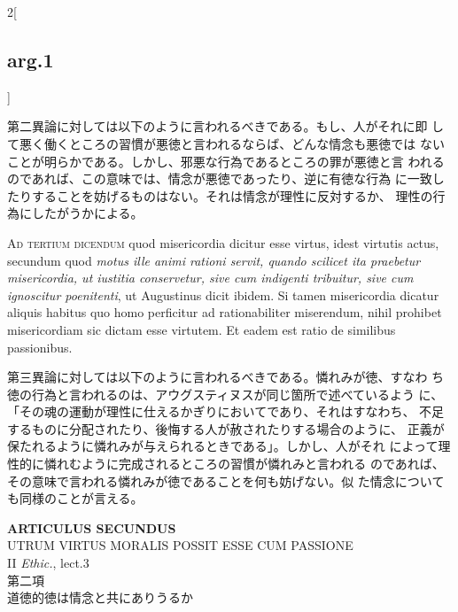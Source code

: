 \documentclass[paper=a4paper,fontsize=10pt,jafontsize=9pt,titlepage]{jlreq}
\begin{document}
\begin{paracol}{2}[\subsection{arg.1}]
\switchcolumn

第二異論に対しては以下のように言われるべきである。もし、人がそれに即
 して悪く働くところの習慣が悪徳と言われるならば、どんな情念も悪徳では
 ないことが明らかである。しかし、邪悪な行為であるところの罪が悪徳と言
 われるのであれば、この意味では、情念が悪徳であったり、逆に有徳な行為
 に一致したりすることを妨げるものはない。それは情念が理性に反対するか、
 理性の行為にしたがうかによる。

\switchcolumn*[\subsection{ad.3}]

{\scshape Ad tertium dicendum} quod misericordia dicitur esse virtus,
idest virtutis actus, secundum quod {\itshape motus ille animi rationi
servit, quando scilicet ita praebetur misericordia, ut iustitia
conservetur, sive cum indigenti tribuitur, sive cum ignoscitur
poenitenti}, ut Augustinus dicit ibidem. Si tamen misericordia dicatur
aliquis habitus quo homo perficitur ad rationabiliter miserendum,
nihil prohibet misericordiam sic dictam esse virtutem. Et eadem est
ratio de similibus passionibus.

\switchcolumn

第三異論に対しては以下のように言われるべきである。憐れみが徳、すなわ
 ち徳の行為と言われるのは、アウグスティヌスが同じ箇所で述べているよう
 に、「その魂の運動が理性に仕えるかぎりにおいてであり、それはすなわち、
 不足するものに分配されたり、後悔する人が赦されたりする場合のように、
 正義が保たれるように憐れみが与えられるときである」。しかし、人がそれ
 によって理性的に憐れむように完成されるところの習慣が憐れみと言われる
 のであれば、その意味で言われる憐れみが徳であることを何も妨げない。似
 た情念についても同様のことが言える。

\end{paracol}
\newpage
{}
{}
\setcounter{section}{2}
\setcounter{subsection}{0}


\begin{center}
{\Large {\bfseries ARTICULUS SECUNDUS}}\\
{\large UTRUM VIRTUS MORALIS POSSIT ESSE CUM PASSIONE}\\
{\footnotesize II {\itshape Ethic.}, lect.3}\\
{\Large 第二項\\道徳的徳は情念と共にありうるか}
\end{center}
\end{document}
